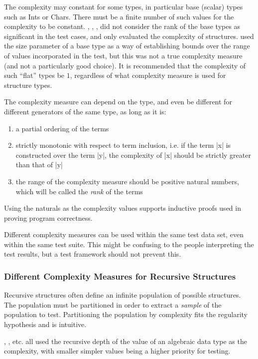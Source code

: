 The complexity may constant for some types, 
in particular base (scalar) types such as Ints or Chars.
There must be a finite number of such values 
for the complexity to be constant.
\QC, \EC, \GAST, \FEAT did not consider the rank of the base types as significant in the test cases,
and only evaluated the complexity of structures.
\SC used the size parameter of a base type as a way of establishing
bounds over the range of values incorporated in the test,
but this was not a true complexity measure (and not a particularly good choice).
It is recommended that the complexity of such ``flat'' types be $1$,
regardless of what complexity measure is used for structure types.

The complexity measure can depend on the type,
and even be different for different generators of the same type,
as long as it is:

\begin{enumerate}
\item a partial ordering of the terms
\item strictly monotonic with respect to term inclusion,
i.e. if the term |x| is constructed over the term |y|, the complexity of |x| should be strictly greater than that of |y|
\item the range of the complexity measure should be positive natural numbers,
which will be called the \emph{rank} of the terms
\end{enumerate}

Using the naturals as the complexity values supports inductive proofs
used in proving program correctness.

Different complexity measures can be used within the same test data set,
even within the same test suite.
This might be confusing to the people interpreting the test results,
but a test framework should not prevent this.

\subsubsection{Different Complexity Measures for Recursive Structures}

Recursive structures often define an infinite population of possible structures.
The population must be partitioned
in order to extract a \emph{sample} of the population to test.
Partitioning the population by complexity fits the regularity hypothesis
and is intuitive.

\QC, \SC, etc. all used the recursive depth of the value of an algebraic data type
as the complexity, with smaller simpler values being a higher priority for testing.

